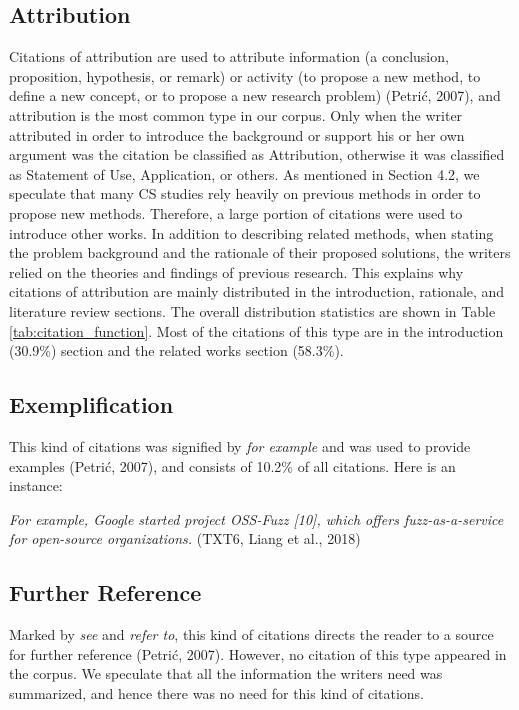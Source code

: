 \subsection{Attribution}
Citations of attribution are used to attribute information (a conclusion, proposition, hypothesis, or remark) or activity (to propose a new method, to define a new concept, or to propose a new research problem) (Petrić, 2007), and attribution is the most common type in our corpus. Only when the writer attributed in order to introduce the background or support his or her own argument was the citation be classified as Attribution, otherwise it was classified as Statement of Use, Application, or others. As mentioned in Section 4.2, we speculate that many CS studies rely heavily on previous methods in order to propose new methods. Therefore, a large portion of citations were used to introduce other works. In addition to describing related methods, when stating the problem background and the rationale of their proposed solutions, the writers relied on the theories and findings of previous research. This explains why citations of attribution are mainly distributed in the introduction, rationale, and literature review sections. The overall distribution statistics are shown in Table \ref{tab:citation_function}. Most of the citations of this type are in the introduction (30.9\%) section and the related works section (58.3\%).

\subsection{Exemplification}
This kind of citations was signified by \textit{for example} and was used to provide examples (Petrić, 2007), and consists of 10.2\% of all citations. Here is an instance:

\textit{For example, Google started project OSS-Fuzz [10], which offers fuzz-as-a-service for open-source organizations.} (TXT6, Liang et al., 2018)

\subsection{Further Reference}
Marked by \textit{see} and \textit{refer to}, this kind of citations directs the reader to a source for further reference (Petrić, 2007). However, no citation of this type appeared in the corpus. We speculate that all the information the writers need was summarized, and hence there was no need for this kind of citations.

